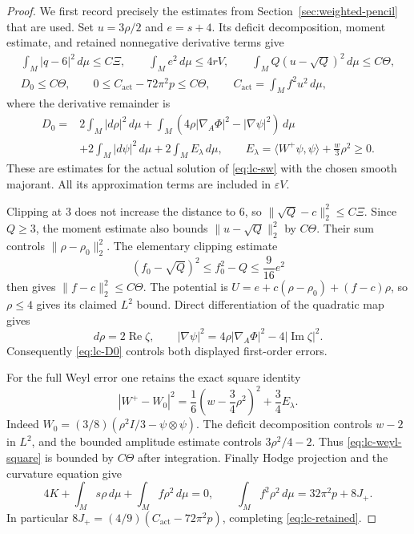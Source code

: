 \begin{proof}
We first record precisely the estimates from Section~\ref{sec:weighted-pencil}
that are used.  Set $u=3\rho/2$ and $e=s+4$.  Its deficit decomposition,
moment estimate, and retained nonnegative derivative terms give
\begin{equation}\label{eq:lc-moment-input}
\begin{gathered}
 \int_M|q-6|^2\,d\mu\le C\Xi,\qquad
 \int_M e^2\,d\mu\le4rV,\qquad
 \int_M Q(u-\sqrt Q)^2\,d\mu\le C\Theta,\\
 D_0\le C\Theta,\qquad
 0\le C_{\mathrm{act}}-72\pi^2p\le C\Theta,
 \qquad C_{\mathrm{act}}=\int_M f^2u^2\,d\mu,
\end{gathered}
\end{equation}
where the derivative remainder is
\begin{equation}\label{eq:lc-D0}
\begin{split}
 D_0={}&2\int_M|d\rho|^2\,d\mu
 +\int_M(4\rho|\nabla_A\Phi|^2-|\nabla\psi|^2)\,d\mu\\
 &+2\int_M|d\psi|^2\,d\mu+2\int_M E_\lambda\,d\mu,
 \qquad
 E_\lambda=\langle W^+\psi,\psi\rangle+\frac w3\rho^2\ge0.
\end{split}
\end{equation}
These are estimates for the actual solution of \eqref{eq:lc-sw} with
the chosen smooth majorant.  All its approximation terms are included
in $\varepsilon V$.

Clipping at $3$ does not increase the distance to $6$, so
$\|\sqrt Q-c\|_2^2\le C\Xi$.  Since $Q\ge3$, the moment estimate
also bounds $\|u-\sqrt Q\|_2^2$ by $C\Theta$.  Their sum controls
$\|\rho-\rho_0\|_2^2$.  The elementary clipping estimate
\[
 (f_0-\sqrt Q)^2\le f_0^2-Q\le\frac9{16}e^2
\]
then gives $\|f-c\|_2^2\le C\Theta$.  The potential is
$U=e+c(\rho-\rho_0)+(f-c)\rho$, so $\rho\le4$ gives its claimed
$L^2$ bound.  Direct differentiation of the quadratic map gives
\begin{equation}\label{eq:lc-hopf}
 d\rho=2\operatorname{Re}\zeta,\qquad
 |\nabla\psi|^2=4\rho|\nabla_A\Phi|^2-4|\operatorname{Im}\zeta|^2.
\end{equation}
Consequently \eqref{eq:lc-D0} controls both displayed first-order errors.

For the full Weyl error one retains the exact square identity
\begin{equation}\label{eq:lc-weyl-square}
 |W^+-W_0|^2
 =\frac16\left(w-\frac34\rho^2\right)^2+\frac34E_\lambda.
\end{equation}
Indeed $W_0=(3/8)(\rho^2 I/3-\psi\otimes\psi)$.  The deficit
decomposition controls $w-2$ in $L^2$, and the bounded amplitude
estimate controls $3\rho^2/4-2$.  Thus \eqref{eq:lc-weyl-square}
is bounded by $C\Theta$ after integration.  Finally Hodge projection
and the curvature equation give
\begin{equation}\label{eq:lc-two-retained-identities}
 4K+\int_M s\rho\,d\mu+\int_M f\rho^2\,d\mu=0,
 \qquad
 \int_M f^2\rho^2\,d\mu=32\pi^2p+8J_+.
\end{equation}
In particular $8J_+=(4/9)(C_{\mathrm{act}}-72\pi^2p)$, completing
\eqref{eq:lc-retained}.


\end{proof}
